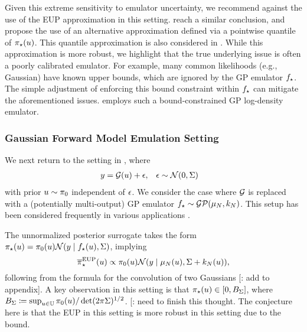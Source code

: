 \documentclass[12pt]{article}
\begin{document}
Given this extreme sensitivity to emulator uncertainty, we recommend against the use of the EUP
approximation in this setting. \citet{VehtariParallelGP} reach a similar conclusion, and propose
the use of an alternative approximation defined via a pointwise quantile of ${\pi}_{\star}(u)$.
This quantile approximation is also considered in \citet{quantileApprox,FATES_CES}.
While this approximation is more robust, we highlight that the true underlying issue is often 
a poorly calibrated emulator. For example, many common likelihoods (e.g., Gaussian) 
have known upper bounds, which are ignored by the GP emulator ${f}_{\star}$. The simple 
adjustment of enforcing this bound constraint within ${f}_{\star}$ can mitigate the aforementioned issues.
\citet{quantileApprox} employs such a bound-constrained GP log-density emulator.

\subsubsection{Gaussian Forward Model Emulation Setting} \label{sec:fwd-Gaussian} 
We next return to the setting in , where
\begin{align}
&y = \mathcal{G}(u) + \epsilon, &&\epsilon \sim \mathcal{N}(0, \Sigma)
\end{align}
with prior $u \sim \pi_0$ independent of $\epsilon$. We consider the case 
where $\mathcal{G}$ is replaced with a (potentially multi-output) GP emulator 
${f}_{\star} \sim \mathcal{GP}(\mu_{N}, k_{N})$. This setup has been considered frequently in various 
applications \citep{Surer2023sequential,weightedIVAR,StuartTeck2,GP_PDE_priors,CES,
idealizedGCM,villani2024posteriorsamplingadaptivegaussian,hydrologicalModel,hydrologicalModel2}.

The unnormalized posterior surrogate takes the form 
${\pi}_{\star}(u) = \pi_0(u)\mathcal{N}(y \mid {f}_{\star}(u), \Sigma)$, implying
\begin{equation}
{\overline{\pi}}_{\star}^{\mathrm{EUP}}(u) \propto \pi_0(u) \mathcal{N}(y \mid \mu_{N}(u), \Sigma + k_{N}(u)),
\label{eq:EUP-Gaussian-fwd}
\end{equation}
following from the formula for the convolution of two Gaussians [\todo: add to appendix].
A key observation in this setting is that ${\pi}_{\star}(u) \in [0, B_{\Sigma}]$, where 
$B_{\Sigma} \coloneqq \sup_{u \in \mathbb{U}} \pi_0(u) / \det(2\pi\Sigma)^{1/2}$.
[\todo: need to finish this thought. The conjecture here is that the EUP in this setting is 
more robust in this setting due to the bound.
\end{document}
